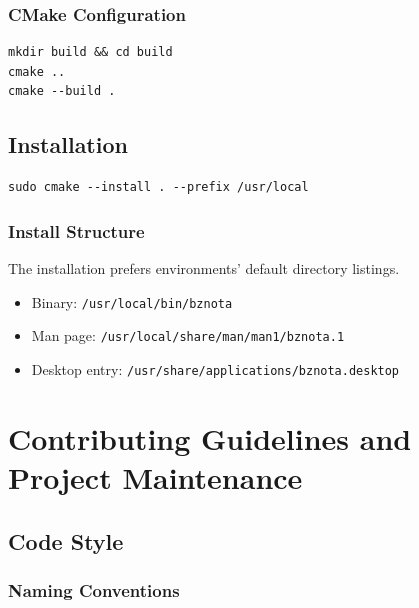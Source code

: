 \documentclass[12pt,a4paper,oneside,openany]{report}
\begin{document}
\subsection{CMake Configuration}

\begin{lstlisting}
mkdir build && cd build
cmake ..
cmake --build .
\end{lstlisting}

\section{Installation}

\begin{lstlisting}
sudo cmake --install . --prefix /usr/local
\end{lstlisting}

\subsection{Install Structure}

\par
The installation prefers environments' default directory listings.

\begin{itemize}
	\item Binary: \texttt{/usr/local/bin/bznota}
	\item Man page: \texttt{/usr/local/share/man/man1/bznota.1}
	\item Desktop entry: \texttt{/usr/share/applications/bznota.desktop}
\end{itemize}

\chapter{Contributing Guidelines and Project Maintenance}

\section{Code Style}

\subsection{Naming Conventions}
\end{document}
